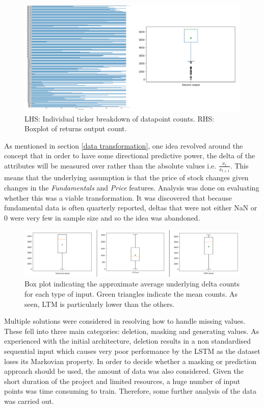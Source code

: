 \documentclass[10pt,onecolumn,letterpaper]{article}
\begin{document}
\begin{figure}[!hbt!]
\centering
\includegraphics[width=\columnwidth]{output_counts.png}
\caption{LHS: Individual ticker breakdown of datapoint counts. RHS: Boxplot of returns output count.}
\end{figure}

As mentioned in section \ref{data transformation}, one idea revolved around the concept that in order to have some directional predictive power, the delta of the attributes will be measured over rather than the absolute values i.e. $\frac{x_{t}}{x_{t+1}}$. This means that the underlying assumption is that the price of stock changes given changes in the \textit{Fundamentals} and \textit{Price} features. Analysis was done on evaluating whether this was a viable transformation. It was discovered that because fundamental data is often quarterly reported, deltas that were not either NaN or 0 were very few in sample size and so the idea was abandoned. 

\begin{figure}[!hbt!]
\centering
\includegraphics[width=\columnwidth]{input_delta_counts.png}
\caption{Box plot indicating the approximate average underlying delta counts for each type of input. Green triangles indicate the mean counts. As seen, LTM is particularly lower than the others.}
\label{input_delta_counts}
\end{figure}

Multiple solutions were considered in resolving how to handle missing values. These fell into three main categories: deletion, masking and generating values. As experienced with the initial architecture, deletion results in a non standardised sequential input which causes very poor performance by the LSTM as the dataset loses its Markovian property. In order to decide whether a masking or prediction approach should be used, the amount of data was also considered. Given the short duration of the project and limited resources, a huge number of input points was time consuming to train. Therefore, some further analysis of the data was carried out.  
\end{document}
